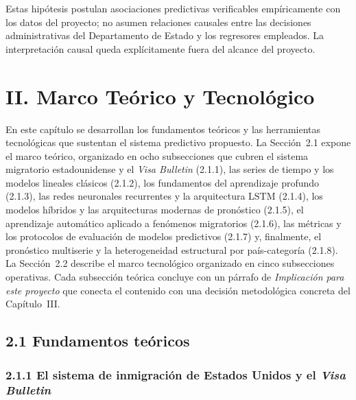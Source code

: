\documentclass[12pt,letterpaper]{report}
\begin{document}
Estas hipótesis postulan asociaciones predictivas verificables empíricamente con los datos del proyecto; no asumen relaciones causales entre las decisiones administrativas del Departamento de Estado y los regresores empleados. La interpretación causal queda explícitamente fuera del alcance del proyecto.

\clearpage

\chapter{II. Marco Teórico y Tecnológico}

En este capítulo se desarrollan los fundamentos teóricos y las herramientas tecnológicas que sustentan el sistema predictivo propuesto. La Sección~2.1 expone el marco teórico, organizado en ocho subsecciones que cubren el sistema migratorio estadounidense y el \textit{Visa Bulletin} (2.1.1), las series de tiempo y los modelos lineales clásicos (2.1.2), los fundamentos del aprendizaje profundo (2.1.3), las redes neuronales recurrentes y la arquitectura LSTM (2.1.4), los modelos híbridos y las arquitecturas modernas de pronóstico (2.1.5), el aprendizaje automático aplicado a fenómenos migratorios (2.1.6), las métricas y los protocolos de evaluación de modelos predictivos (2.1.7) y, finalmente, el pronóstico multiserie y la heterogeneidad estructural por país-categoría (2.1.8). La Sección~2.2 describe el marco tecnológico organizado en cinco subsecciones operativas. Cada subsección teórica concluye con un párrafo de \textit{Implicación para este proyecto} que conecta el contenido con una decisión metodológica concreta del Capítulo~III.

\section{2.1 Fundamentos teóricos}

\subsection{2.1.1 El sistema de inmigración de Estados Unidos y el \textit{Visa Bulletin}}
\end{document}
